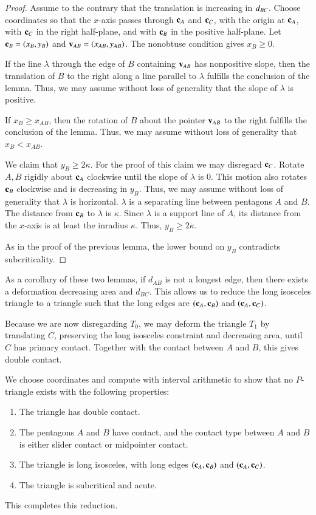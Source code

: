 \begin{proof}
  Assume to the contrary that the translation is increasing in
  $d_{BC}$.  Choose coordinates so that the $x$-axis passes through
  ${\mathbf c}_A$ and ${\mathbf c}_C$, with the origin at ${\mathbf c}_A$, with ${\mathbf c}_C$ in the
  right half-plane, and with ${\mathbf c}_B$ in the positive half-plane.
  Let ${\mathbf c}_B=(x_B,y_B)$ and ${\mathbf v}_{AB}=(x_{AB},y_{AB})$.
  The nonobtuse condition gives $x_B\ge0$.

  If the line $\lambda$ through the edge of $B$ containing ${\mathbf v}_{AB}$
  has nonpositive slope, then the translation of $B$ to the
  right along a line parallel to $\lambda$
  fulfills the conclusion of the lemma.  Thus, we may assume without
  loss of generality that the slope of $\lambda$ is positive.

  If $x_B\ge x_{AB}$, then the rotation of $B$ about the pointer ${\mathbf v}_{AB}$
  to the right fulfills the conclusion of the lemma.
  Thus, we may assume without loss of generality that $x_B<x_{AB}$.

  We claim that $y_B\ge 2\kappa$.  For the proof of this claim we may disregard ${\mathbf c}_C$.
  Rotate $A,B$ rigidly about ${\mathbf c}_A$ clockwise until the slope of $\lambda$ is $0$.
  This motion also rotates ${\mathbf c}_B$ clockwise and is decreasing in $y_B$.
  Thus, we may assume without loss of generality that $\lambda$ is horizontal.
  $\lambda$ is a separating line between pentagons $A$ and $B$.  The distance
  from ${\mathbf c}_B$ to $\lambda$ is $\kappa$. Since $\lambda$ is a support line of $A$,
  its distance from the $x$-axis is at least the inradius $\kappa$.  Thus, $y_B\ge 2\kappa$.

  As in the proof of the previous lemma, the lower bound on $y_B$ contradicts subcriticality.

\end{proof}

As a corollary of these two lemmas, if $d_{AB}$ is not a longest edge,
then there exists a deformation decreasing area and $d_{BC}$.  This
allows us to reduce the long isosceles triangle to a triangle such
that the long edges are $({\mathbf c}_A,{\mathbf c}_B)$ and $({\mathbf c}_A,{\mathbf c}_C)$.

Because we are now disregarding $T_0$, we may deform the
triangle $T_1$ by translating $C$, preserving the long isosceles constraint
and decreasing area, until $C$ has primary contact. Together with the contact between
$A$ and $B$, this gives double contact.

 We choose coordinates and
compute with interval
arithmetic to show that no $P$-triangle exists with the
following properties:
\begin{enumerate}
\item The triangle has double contact.
\item The pentagons $A$ and $B$ have contact,
  and the contact type between $A$ and $B$ is either slider contact or
  midpointer contact.
\item The triangle is long isosceles, with long edges $({\mathbf c}_A,{\mathbf c}_B)$ and $({\mathbf c}_A,{\mathbf c}_C)$.
\item The triangle is subcritical and acute.
\end{enumerate}
This
completes this reduction.

